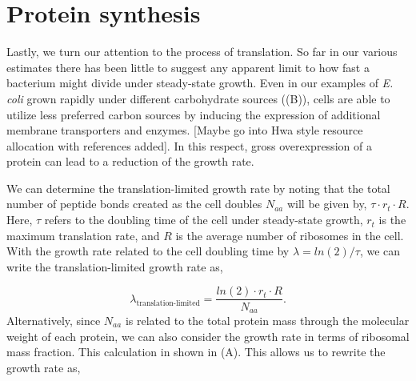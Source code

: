 \section{Protein synthesis}

Lastly, we turn our attention to the process of translation. So far in our
various estimates there has been little to suggest any apparent limit to how
fast a bacterium might divide under steady-state growth. Even in our examples of
\textit{E. coli} grown rapidly under different carbohydrate sources
((B)),  cells are able to utilize less preferred carbon
sources by inducing the expression of additional membrane transporters and
enzymes. [Maybe go into Hwa style resource allocation with references added]. In
this respect, gross overexpression of a protein can lead to a reduction of the
growth rate.

We can determine the translation-limited growth rate by noting that the total
number of peptide bonds created as the cell doubles $N_{aa}$ will be given by,
$\tau \cdot r_t \cdot R$. Here, $\tau$ refers to the doubling time of the cell
under steady-state growth, $r_t$ is the maximum translation rate, and $R$ is the
average number of ribosomes in the cell. With the growth rate related to the
cell doubling time by $\lambda = ln(2)/\tau$, we can write the
translation-limited growth rate as,

\begin{equation}
\lambda_{\textrm{translation-limited}} = \frac{ln(2) \cdot r_t \cdot R}{N_{aa}}.
\end{equation}
Alternatively, since $N_{aa}$ is related to the total protein mass through the
molecular weight of each protein, we can also consider the growth rate in terms
of ribosomal mass fraction. This calculation in shown in (A).
This allows us to rewrite the growth rate as,

%

